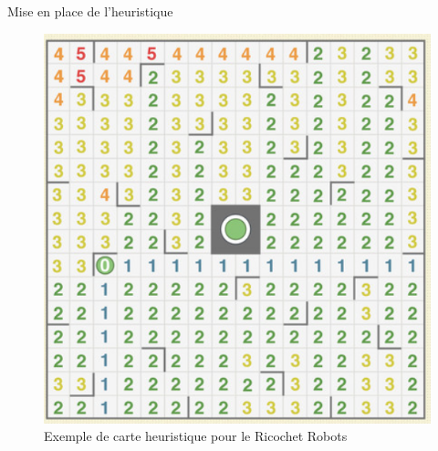 \documentclass{beamer}
\begin{document}
    \begin{frame}{Mise en place de l'heuristique}
         \begin{figure}
            \centering
            \includegraphics[scale=0.5]{images/mapHeuristique.PNG}
            \caption{Exemple de carte heuristique pour le Ricochet Robots\cite{heurist}}
        \end{figure}
    \end{frame}
\end{document}
